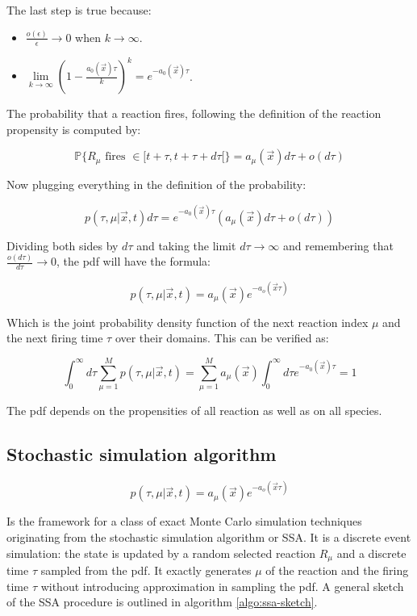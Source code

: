     The last step is true because:

    \begin{multicols}{2}
      \begin{itemize}
        \item $\frac{o(\epsilon)}{\epsilon}\rightarrow 0$ when $k\rightarrow\infty$.
        \item $\lim\limits_{k\rightarrow\infty}\left(1-\frac{a_0(\vec{x})\tau}{k}\right)^k = e^{-a_0(\vec{x})\tau}$.
      \end{itemize}
    \end{multicols}

    The probability that a reaction fires, following the definition of the reaction propensity is computed by:

    $$\mathbb{P}\{R_\mu\text{ fires }\in[t+\tau, t+\tau+d\tau[\} = a_\mu(\vec{x})d\tau+o(d\tau)$$

    Now plugging everything in the definition of the probability:

    $$p(\tau, \mu|\vec{x}, t)d\tau = e^{-a_0(\vec{x})\tau}(a_\mu(\vec{x})d\tau+o(d\tau))$$

    Dividing both sides by $d\tau$ and taking the limit $d\tau\rightarrow\infty$ and remembering that $\frac{o(d\tau)}{d\tau} \rightarrow 0$, the pdf will have the formula:

    $$p(\tau, \mu|\vec{x},t) = a_\mu(\vec{x})e^{-a_o(\vec{x}\tau)}$$

    Which is the joint probability density function of the next reaction index $\mu$ and the next firing time $\tau$ over their domains.
    This can be verified as:

    $$\int_0^\infty d\tau\sum\limits_{\mu=1}^Mp(\tau, \mu|\vec{x}, t) = \sum\limits_{\mu=1}^Ma_\mu(\vec{x})\int_0^\infty d\tau e^{-a_0(\vec{x})\tau} = 1$$

    The pdf depends on the propensities of all reaction as well as on all species.

  \subsection{Stochastic simulation algorithm}

  $$p(\tau, \mu|\vec{x},t) = a_\mu(\vec{x})e^{-a_o(\vec{x}\tau)}$$

  Is the framework for a class of exact Monte Carlo simulation techniques originating from the stochastic simulation algorithm or SSA.
  It is a discrete event simulation: the state is updated by a random selected reaction $R_\mu$ and a discrete time $\tau$ sampled from the pdf.
  It exactly generates $\mu$ of the reaction and the firing time $\tau$ without introducing approximation in sampling the pdf.
  A general sketch of the SSA procedure is outlined in algorithm \ref{algo:ssa-sketch}.

